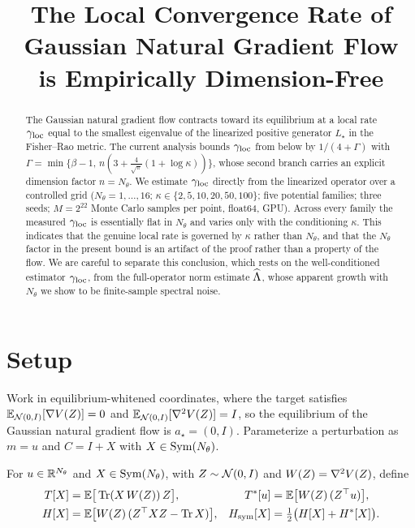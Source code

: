 \documentclass[11pt]{article}
\title{The Local Convergence Rate of Gaussian Natural Gradient Flow\\
is Empirically Dimension-Free}
\author{}
\date{}
\begin{document}
\maketitle

\begin{abstract}
The Gaussian natural gradient flow contracts toward its equilibrium at a local
rate $\gamma_{\mathrm{loc}}$ equal to the smallest eigenvalue of the linearized positive
generator $L_\star$ in the Fisher--Rao metric. The current analysis bounds
$\gamma_{\mathrm{loc}}$ from below by $1/(4+\Gamma)$ with
$\Gamma=\min\{\beta-1,\,n(3+\tfrac{4}{\sqrt\pi}(1+\log\kappa))\}$, whose second
branch carries an explicit dimension factor $n=N_\theta$. We estimate $\gamma_{\mathrm{loc}}$
directly from the linearized operator over a controlled grid
($N_\theta=1,\dots,16$; $\kappa\in\{2,5,10,20,50,100\}$; five potential families;
three seeds; $M=2^{22}$ Monte Carlo samples per point, float64, GPU). Across
every family the measured $\gamma_{\mathrm{loc}}$ is essentially flat in $N_\theta$ and varies
only with the conditioning $\kappa$. This indicates that the genuine local rate
is governed by $\kappa$ rather than $N_\theta$, and that the $N_\theta$ factor in
the present bound is an artifact of the proof rather than a property of the flow.
We are careful to separate this conclusion, which rests on the well-conditioned
estimator $\gamma_{\mathrm{loc}}$, from the full-operator norm estimate $\widehat{\Lambda}$, whose apparent
growth with $N_\theta$ we show to be finite-sample spectral noise.
\end{abstract}

\section{Setup}

Work in equilibrium-whitened coordinates, where the target satisfies
$\mathbb{E}_{\mathcal{N}(0,I)}[\nabla V(Z)]=0$ and $\mathbb{E}_{\mathcal{N}(0,I)}[\nabla^2 V(Z)]=I$, so the
equilibrium of the Gaussian natural gradient flow is $a_\star=(0,I)$.
Parameterize a perturbation as $m=u$ and $C=I+X$ with $X\in\mathrm{Sym}(N_\theta)$.

\begin{definition}\label{def:ops}
For $u\in\mathbb{R}^{N_\theta}$ and $X\in\mathrm{Sym}(N_\theta)$, with $Z\sim\mathcal{N}(0,I)$ and
$W(Z)=\nabla^2 V(Z)$, define
\begin{align*}
T[X]&=\mathbb{E}\big[\operatorname{Tr}(X\,W(Z))\,Z\big], &
T^\ast[u]&=\mathbb{E}\big[W(Z)\,(Z^\top u)\big], \\
H[X]&=\mathbb{E}\big[W(Z)\,(Z^\top X Z-\operatorname{Tr} X)\big], &
H_{\mathrm{sym}}[X]&=\tfrac12\big(H[X]+H^\ast[X]\big).
\end{align*}
\end{definition}
\end{document}
